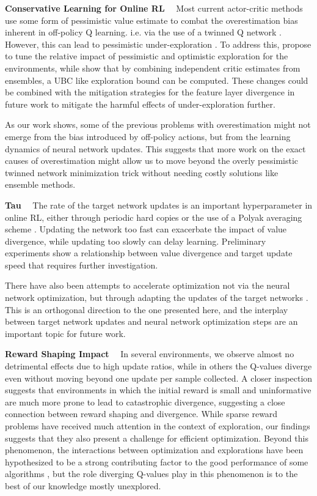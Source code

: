 {\bf Conservative Learning for Online RL}~~ Most current actor-critic methods use some form of pessimistic value estimate to combat the overestimation bias inherent in off-policy Q learning. i.e. via the use of a twinned Q network \parencite{fujimoto2018addressing}.
However, this can lead to pessimistic under-exploration \parencite{lan2020maxmin}.
To address this, \textcite{moskovitz2021tactical} propose to tune the relative impact of pessimistic and optimistic exploration for the environments, while \textcite{lee2021sunrise} show that by combining independent critic estimates from ensembles, a UBC like exploration bound can be computed.
These changes could be combined with the mitigation strategies for the feature layer divergence in future work to mitigate the harmful effects of under-exploration further.

As our work shows, some of the previous problems with overestimation might not emerge from the bias introduced by off-policy actions, but from the learning dynamics of neural network updates.
This suggests that more work on the exact causes of overestimation might allow us to move beyond the overly pessimistic twinned network minimization trick without needing costly solutions like ensemble methods.

{\bf Tau}~~ The rate of the target network updates is an important hyperparameter in online RL, either through periodic hard copies \parencite{dqn} or the use of a Polyak averaging scheme \parencite{ddpg}.
Updating the network too fast can exacerbate the impact of value divergence, while updating too slowly can delay learning. Preliminary experiments show a relationship between value divergence and target update speed that requires further investigation.

There have also been attempts to accelerate optimization not via the neural network optimization, but through adapting the updates of the target networks \parencite{vieillard2020momentum,farahmand2021pid}.
This is an orthogonal direction to the one presented here, and the interplay between target network updates and neural network optimization steps are an important topic for future work.


{\bf Reward Shaping Impact}~~ In several environments, we observe almost no detrimental effects due to high update ratios, while in others the Q-values diverge even without moving beyond one update per sample collected.
A closer inspection suggests that environments in which the initial reward is small and uninformative are much more prone to lead to catastrophic divergence, suggesting a close connection between reward shaping and divergence.
While sparse reward problems have received much attention in the context of exploration, our findings suggests that they also present a challenge for efficient optimization.
Beyond this phenomenon, the interactions between optimization and explorations have been hypothesized to be a strong contributing factor to the good performance of some algorithms \parencite{schaul2022phenomenon}, but the role diverging Q-values play in this phenomenon is to the best of our knowledge mostly unexplored.



